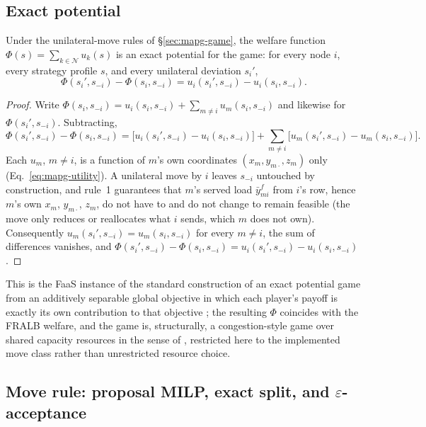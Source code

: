 \subsection{Exact potential}
\label{sec:mapg-potential}

\begin{proposition}
\label{prop:mapg-potential}
Under the unilateral-move rules of \S\ref{sec:mapg-game}, the welfare function
$\Phi(s)=\sum_{k\in\mathcal{N}} u_k(s)$ is an exact potential for the game:
for every node $i$, every strategy profile $s$, and every unilateral
deviation $s_i'$,
\[
  \Phi(s_i',s_{-i}) - \Phi(s_i,s_{-i}) = u_i(s_i',s_{-i}) - u_i(s_i,s_{-i}).
\]
\end{proposition}
\begin{proof}
Write $\Phi(s_i,s_{-i})=u_i(s_i,s_{-i})+\sum_{m\ne i}u_m(s_i,s_{-i})$ and
likewise for $\Phi(s_i',s_{-i})$. Subtracting,
\[
  \Phi(s_i',s_{-i})-\Phi(s_i,s_{-i})
  = \big[u_i(s_i',s_{-i})-u_i(s_i,s_{-i})\big]
  + \sum_{m\ne i}\big[u_m(s_i',s_{-i})-u_m(s_i,s_{-i})\big].
\]
Each $u_m$, $m\ne i$, is a function of $m$'s own coordinates
$(x_m,y_{m\cdot},z_m)$ only (Eq.~\eqref{eq:mapg-utility}). A unilateral move
by $i$ leaves $s_{-i}$ untouched by construction, and rule~1 guarantees that
$m$'s served load $\bar y_{mi}^f$ from $i$'s row, hence $m$'s own $x_m$,
$y_{m\cdot}$, $z_m$, do not have to and do not change to remain feasible
(the move only reduces or reallocates what $i$ sends, which $m$ does not
own). Consequently $u_m(s_i',s_{-i})=u_m(s_i,s_{-i})$ for every $m\ne i$, the
sum of differences vanishes, and
$\Phi(s_i',s_{-i})-\Phi(s_i,s_{-i})=u_i(s_i',s_{-i})-u_i(s_i,s_{-i})$.
\end{proof}

This is the FaaS instance of the standard construction of an exact potential
game from an additively separable global objective in which each player's
payoff is exactly its own contribution to that objective
\citep{monderershapley1996}; the resulting $\Phi$ coincides with the FRALB
welfare, and the game is, structurally, a congestion-style game over shared
capacity resources in the sense of \citet{rosenthal1973}, restricted here to
the implemented move class rather than unrestricted resource choice.

\subsection{Move rule: proposal MILP, exact split, and $\varepsilon$-acceptance}
\label{sec:mapg-move}

